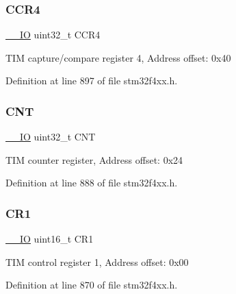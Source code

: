 \subsubsection{\texorpdfstring{C\+C\+R4}{CCR4}}
{\footnotesize\ttfamily \hyperlink{group___c_m_s_i_s__core__definitions_gaec43007d9998a0a0e01faede4133d6be}{\+\_\+\+\_\+\+IO} uint32\+\_\+t C\+C\+R4}

T\+IM capture/compare register 4, Address offset\+: 0x40 

Definition at line 897 of file stm32f4xx.\+h.

\mbox{\label{struct_t_i_m___type_def_a6095a27d764d06750fc0d642e08f8b2a}} 
\subsubsection{\texorpdfstring{C\+NT}{CNT}}
{\footnotesize\ttfamily \hyperlink{group___c_m_s_i_s__core__definitions_gaec43007d9998a0a0e01faede4133d6be}{\+\_\+\+\_\+\+IO} uint32\+\_\+t C\+NT}

T\+IM counter register, Address offset\+: 0x24 

Definition at line 888 of file stm32f4xx.\+h.

\mbox{\label{struct_t_i_m___type_def_a61400ce239355b62aa25c95fcc18a5e1}} 
\subsubsection{\texorpdfstring{C\+R1}{CR1}}
{\footnotesize\ttfamily \hyperlink{group___c_m_s_i_s__core__definitions_gaec43007d9998a0a0e01faede4133d6be}{\+\_\+\+\_\+\+IO} uint16\+\_\+t C\+R1}

T\+IM control register 1, Address offset\+: 0x00 

Definition at line 870 of file stm32f4xx.\+h.

\mbox{\label{struct_t_i_m___type_def_a2a3e81bd118d1bc52d24a0b0772e6a0c}} 
